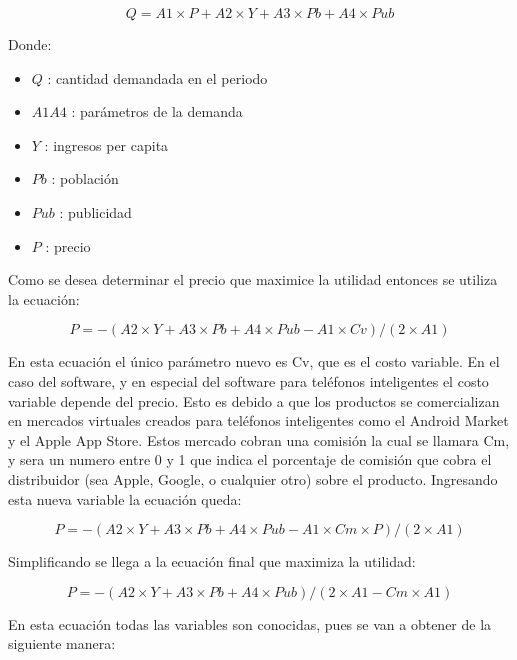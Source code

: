 \documentclass[a4paper, 12pt, oneside]{article}
\begin{document}
	\begin{equation}
	Q = A1 \times P + A2 \times Y + A3 \times Pb + A4 \times Pub 
	\end{equation}

	Donde:

	\begin{itemize}
	      \item $Q$ : cantidad demandada en el periodo
	      \item $A1 A4$ : parámetros de la demanda
	      \item $Y$ : ingresos per capita
	      \item $Pb$ : población
	      \item $Pub$ : publicidad
	      \item $P$ : precio
	\end{itemize}

	Como se desea determinar el precio que maximice la utilidad entonces se utiliza la ecuación:

	\begin{equation}
	P = -(A2 \times Y + A3 \times Pb + A4 \times Pub  - A1 \times Cv) / (2 \times A1)
	\end{equation}

	En esta ecuación el único parámetro nuevo es Cv, que es el costo variable. En el caso del software, y en especial del software para teléfonos inteligentes el costo variable
	depende del precio. Esto es debido a que los productos se comercializan en mercados virtuales creados para teléfonos inteligentes como el Android Market y el Apple App Store.
	Estos mercado cobran una comisión la cual se llamara Cm, y sera un numero entre 0 y 1 que indica el porcentaje de comisión que cobra el distribuidor (sea Apple, Google,
	o cualquier otro) sobre el producto. Ingresando esta nueva variable la ecuación queda:

	\begin{equation}
	P = -(A2 \times Y + A3 \times Pb + A4 \times Pub  - A1 \times Cm \times P) / (2 \times A1)
	\end{equation}

	Simplificando se llega a la ecuación final que maximiza la utilidad:

	\begin{equation}
	P = -(A2 \times Y + A3 \times Pb + A4 \times Pub) / (2 \times A1 - Cm \times A1)
	\end{equation}

	En esta ecuación todas las variables son conocidas, pues se van a obtener de la siguiente  manera:
\end{document}
